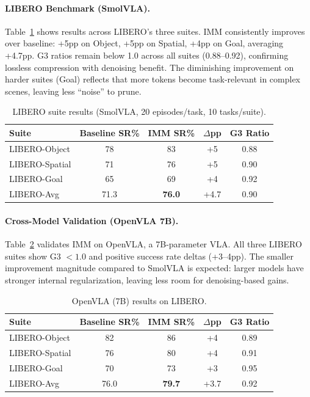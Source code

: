 \documentclass[10pt,twocolumn]{article}
\begin{document}
\paragraph{LIBERO Benchmark (SmolVLA).}
Table~\ref{tab:libero_smol} shows results across LIBERO's three suites. IMM consistently improves over baseline: +5pp on Object, +5pp on Spatial, +4pp on Goal, averaging +4.7pp. G3 ratios remain below 1.0 across all suites (0.88--0.92), confirming lossless compression with denoising benefit. The diminishing improvement on harder suites (Goal) reflects that more tokens become task-relevant in complex scenes, leaving less ``noise'' to prune.

\begin{table}[t]
\centering
\caption{LIBERO suite results (SmolVLA, 20 episodes/task, 10 tasks/suite).}
\label{tab:libero_smol}
\begin{tabular}{lcccc}
\toprule
Suite & Baseline SR\% & IMM SR\% & $\Delta$pp & G3 Ratio \\
\midrule
LIBERO-Object & 78 & 83 & +5 & 0.88 \\
LIBERO-Spatial & 71 & 76 & +5 & 0.90 \\
LIBERO-Goal & 65 & 69 & +4 & 0.92 \\
\midrule
LIBERO-Avg & 71.3 & \textbf{76.0} & +4.7 & 0.90 \\
\bottomrule
\end{tabular}
\end{table}

\paragraph{Cross-Model Validation (OpenVLA 7B).}
Table~\ref{tab:openvla} validates IMM on OpenVLA, a 7B-parameter VLA. All three LIBERO suites show G3 $< 1.0$ and positive success rate deltas (+3--4pp). The smaller improvement magnitude compared to SmolVLA is expected: larger models have stronger internal regularization, leaving less room for denoising-based gains.

\begin{table}[t]
\centering
\caption{OpenVLA (7B) results on LIBERO.}
\label{tab:openvla}
\begin{tabular}{lcccc}
\toprule
Suite & Baseline SR\% & IMM SR\% & $\Delta$pp & G3 Ratio \\
\midrule
LIBERO-Object & 82 & 86 & +4 & 0.89 \\
LIBERO-Spatial & 76 & 80 & +4 & 0.91 \\
LIBERO-Goal & 70 & 73 & +3 & 0.95 \\
\midrule
LIBERO-Avg & 76.0 & \textbf{79.7} & +3.7 & 0.92 \\
\bottomrule
\end{tabular}
\end{table}
\end{document}

